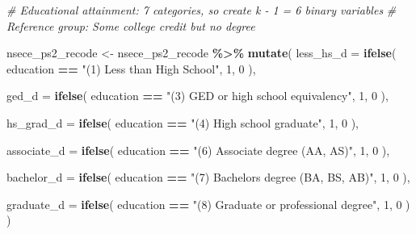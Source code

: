 \documentclass[
]{article}
\newenvironment{Shaded}{\begin{snugshade}}{\end{snugshade}}
\newcommand{\AttributeTok}[1]{\textcolor[rgb]{0.13,0.29,0.53}{#1}}
\newcommand{\CommentTok}[1]{\textcolor[rgb]{0.56,0.35,0.01}{\textit{#1}}}
\newcommand{\DecValTok}[1]{\textcolor[rgb]{0.00,0.00,0.81}{#1}}
\newcommand{\FunctionTok}[1]{\textcolor[rgb]{0.13,0.29,0.53}{\textbf{#1}}}
\newcommand{\NormalTok}[1]{#1}
\newcommand{\OtherTok}[1]{\textcolor[rgb]{0.56,0.35,0.01}{#1}}
\newcommand{\SpecialCharTok}[1]{\textcolor[rgb]{0.81,0.36,0.00}{\textbf{#1}}}
\newcommand{\StringTok}[1]{\textcolor[rgb]{0.31,0.60,0.02}{#1}}
\begin{document}
\begin{Shaded}
\begin{Highlighting}[]
\CommentTok{\# Educational attainment: 7 categories, so create k {-} 1 = 6 binary variables}
\CommentTok{\# Reference group: Some college credit but no degree}

\NormalTok{nsece\_ps2\_recode }\OtherTok{\textless{}{-}}
\NormalTok{  nsece\_ps2\_recode }\SpecialCharTok{\%\textgreater{}\%}
  \FunctionTok{mutate}\NormalTok{(}
    \AttributeTok{less\_hs\_d =} \FunctionTok{ifelse}\NormalTok{(}
\NormalTok{      education }\SpecialCharTok{==} \StringTok{"(1) Less than High School"}\NormalTok{, }\DecValTok{1}\NormalTok{, }\DecValTok{0}
\NormalTok{    ),}
    
    \AttributeTok{ged\_d =} \FunctionTok{ifelse}\NormalTok{(}
\NormalTok{      education }\SpecialCharTok{==} \StringTok{"(3) GED or high school equivalency"}\NormalTok{, }\DecValTok{1}\NormalTok{, }\DecValTok{0}
\NormalTok{    ),}
    
    \AttributeTok{hs\_grad\_d =} \FunctionTok{ifelse}\NormalTok{(}
\NormalTok{      education }\SpecialCharTok{==} \StringTok{"(4) High school graduate"}\NormalTok{, }\DecValTok{1}\NormalTok{, }\DecValTok{0}
\NormalTok{    ),}
    
    \AttributeTok{associate\_d =} \FunctionTok{ifelse}\NormalTok{(}
\NormalTok{      education }\SpecialCharTok{==} \StringTok{"(6) Associate degree (AA, AS)"}\NormalTok{, }\DecValTok{1}\NormalTok{, }\DecValTok{0}
\NormalTok{    ),}
    
    \AttributeTok{bachelor\_d =} \FunctionTok{ifelse}\NormalTok{(}
\NormalTok{      education }\SpecialCharTok{==} \StringTok{"(7) Bachelor\textquotesingle{}s degree (BA, BS, AB)"}\NormalTok{, }\DecValTok{1}\NormalTok{, }\DecValTok{0}
\NormalTok{    ),}
    
    \AttributeTok{graduate\_d =} \FunctionTok{ifelse}\NormalTok{(}
\NormalTok{      education }\SpecialCharTok{==} \StringTok{"(8) Graduate or professional degree"}\NormalTok{, }\DecValTok{1}\NormalTok{, }\DecValTok{0}
\NormalTok{    )}
\NormalTok{  )}


\end{Highlighting}
\end{Shaded}
\end{document}
